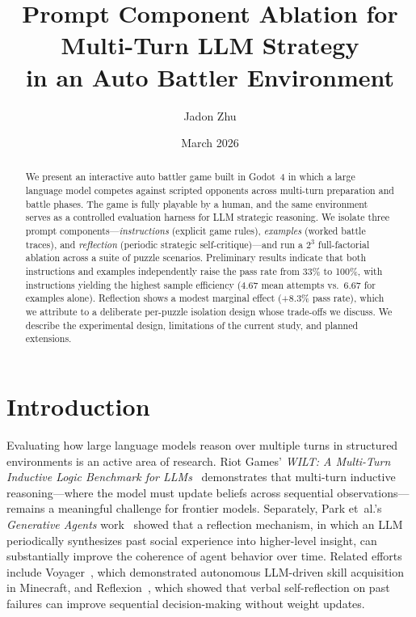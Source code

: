 \documentclass[11pt]{article}
\title{Prompt Component Ablation for Multi-Turn LLM Strategy\\in an Auto Battler Environment}
\author{Jadon Zhu}
\date{March 2026}
\begin{document}
\maketitle

\begin{abstract}
We present an interactive auto battler game built in Godot~4 in which a large language model competes against scripted opponents across multi-turn preparation and battle phases.
The game is fully playable by a human, and the same environment serves as a controlled evaluation harness for LLM strategic reasoning.
We isolate three prompt components---\emph{instructions} (explicit game rules), \emph{examples} (worked battle traces), and \emph{reflection} (periodic strategic self-critique)---and run a $2^3$ full-factorial ablation across a suite of puzzle scenarios.
Preliminary results indicate that both instructions and examples independently raise the pass rate from 33\% to 100\%, with instructions yielding the highest sample efficiency (4.67 mean attempts vs.\ 6.67 for examples alone).
Reflection shows a modest marginal effect (+8.3\% pass rate), which we attribute to a deliberate per-puzzle isolation design whose trade-offs we discuss.
We describe the experimental design, limitations of the current study, and planned extensions.
\end{abstract}

\section{Introduction}\label{sec:intro}

Evaluating how large language models reason over multiple turns in structured environments is an active area of research.
Riot Games' \emph{WILT: A Multi-Turn Inductive Logic Benchmark for LLMs}~\cite{wilt2025} demonstrates that multi-turn inductive reasoning---where the model must update beliefs across sequential observations---remains a meaningful challenge for frontier models.
Separately, Park et~al.'s \emph{Generative Agents} work~\cite{park2023generative} showed that a reflection mechanism, in which an LLM periodically synthesizes past social experience into higher-level insight, can substantially improve the coherence of agent behavior over time.
Related efforts include Voyager~\cite{wang2023voyager}, which demonstrated autonomous LLM-driven skill acquisition in Minecraft, and Reflexion~\cite{shinn2023reflexion}, which showed that verbal self-reflection on past failures can improve sequential decision-making without weight updates.
\end{document}
